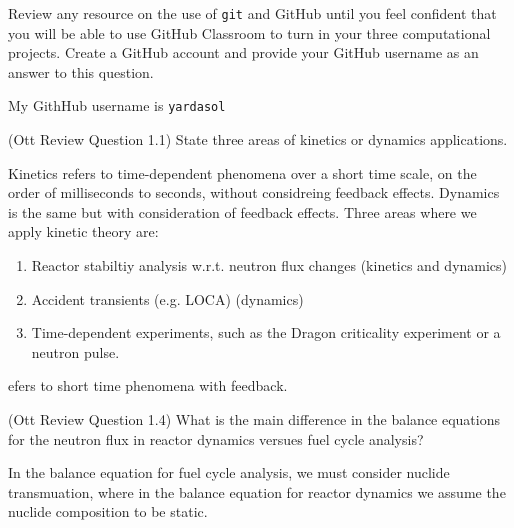\documentclass[11pt,addpoints,answers]{exam}
\begin{document}
\begin{questions}
        \question[20] Review any resource on the use of \texttt{git} and 
                GitHub until you feel confident that you will be able to use 
                GitHub Classroom to turn in your three computational projects. 
                Create a GitHub account and provide your GitHub 
                username as an answer to this question.
                \begin{solution}
                    My GithHub username is \verb.yardasol.
                \end{solution}

        \question[10] (Ott Review Question 1.1)
        State three areas of kinetics or dynamics applications.
                \begin{solution}
                    Kinetics refers to time-dependent phenomena over a short
                    time scale, on the order of milliseconds to seconds, without
                    considreing feedback effects. Dynamics is the same but with
                    consideration of feedback effects. Three areas where
                    we apply kinetic theory are:
                    \begin{enumerate}
                        \item Reactor stabiltiy analysis w.r.t. neutron flux
                            changes (kinetics and dynamics)
                        \item Accident transients (e.g. LOCA) (dynamics)
                        \item Time-dependent experiments, such as the Dragon
                            criticality experiment or a neutron pulse.
                    \end{enumerate}efers to short time phenomena with feedback.
                \end{solution}

        \question[10] (Ott Review Question 1.4)
        What is the main difference in the balance equations for the neutron 
        flux in reactor dynamics versues fuel cycle analysis?
                \begin{solution}
                    In the balance equation for fuel cycle analysis, we must
                    consider nuclide transmuation, where in the balance equation
                    for reactor dynamics we assume the nuclide composition to
                    be static.
                \end{solution}


\end{questions}
\end{document}
